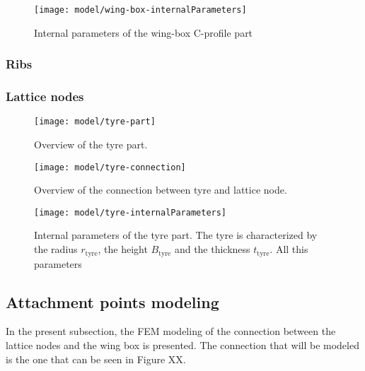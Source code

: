 \begin{figure}[!htpb]
  \centering
  \texttt{[image: model/wing-box-internalParameters]}
  \caption[Internal parameters of the wing-box C-profile part]{Internal parameters of the wing-box C-profile part}\label{fig:wing-box-internalParameters}
\end{figure}

\subsubsection{Ribs} \label{subsubsec:Ribs_Parametrization}

\subsubsection{Lattice nodes} \label{subsubsec:LatticeNodes_Parametrization}

\begin{figure}[!htpb]
  \centering
  \texttt{[image: model/tyre-part]}
  \caption[Overview of the tyre part]{Overview of the tyre part.}\label{fig:tyre-part}
\end{figure}

\begin{figure}[!htpb]
  \centering
  \texttt{[image: model/tyre-connection]}
  \caption[Overview of the connection between tyre and lattice node]{Overview of the connection between tyre and lattice node.}\label{fig:tyre-connection}
\end{figure}

\begin{figure}[!htpb]
  \centering
  \texttt{[image: model/tyre-internalParameters]}
  \caption[Internal parameters of the tyre part]{Internal parameters of the tyre part. The tyre is characterized by the radius $r_{\mathrm{tyre}}$, the height $B_{\mathrm{tyre}}$ and the thickness $t_{\mathrm{tyre}}$. All this parameters }\label{fig:tyre-internalParameters}
\end{figure}

\subsection{Attachment points modeling} \label{subsec:connections_computationalModel}

%
%
% 
%
In the present subsection, the FEM modeling of the connection between the lattice nodes and the wing box is presented. The connection that will be modeled is the one that can be seen in Figure XX.

